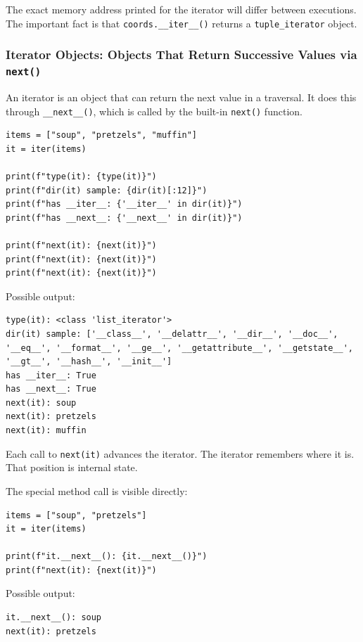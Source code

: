 The exact memory address printed for the iterator will differ between executions. The important fact is that \texttt{coords.\_\_iter\_\_()} returns a \texttt{tuple\_iterator} object.

\subsubsection{Iterator Objects: Objects That Return Successive Values via \texttt{next()}}

An iterator is an object that can return the next value in a traversal. It does this through \texttt{\_\_next\_\_()}, which is called by the built-in \texttt{next()} function.

\begin{verbatim}
items = ["soup", "pretzels", "muffin"]
it = iter(items)

print(f"type(it): {type(it)}")
print(f"dir(it) sample: {dir(it)[:12]}")
print(f"has __iter__: {'__iter__' in dir(it)}")
print(f"has __next__: {'__next__' in dir(it)}")

print(f"next(it): {next(it)}")
print(f"next(it): {next(it)}")
print(f"next(it): {next(it)}")
\end{verbatim}

Possible output:

\begin{verbatim}
type(it): <class 'list_iterator'>
dir(it) sample: ['__class__', '__delattr__', '__dir__', '__doc__',
'__eq__', '__format__', '__ge__', '__getattribute__', '__getstate__',
'__gt__', '__hash__', '__init__']
has __iter__: True
has __next__: True
next(it): soup
next(it): pretzels
next(it): muffin
\end{verbatim}

Each call to \texttt{next(it)} advances the iterator. The iterator remembers where it is. That position is internal state.

The special method call is visible directly:

\begin{verbatim}
items = ["soup", "pretzels"]
it = iter(items)

print(f"it.__next__(): {it.__next__()}")
print(f"next(it): {next(it)}")
\end{verbatim}

Possible output:

\begin{verbatim}
it.__next__(): soup
next(it): pretzels
\end{verbatim}

